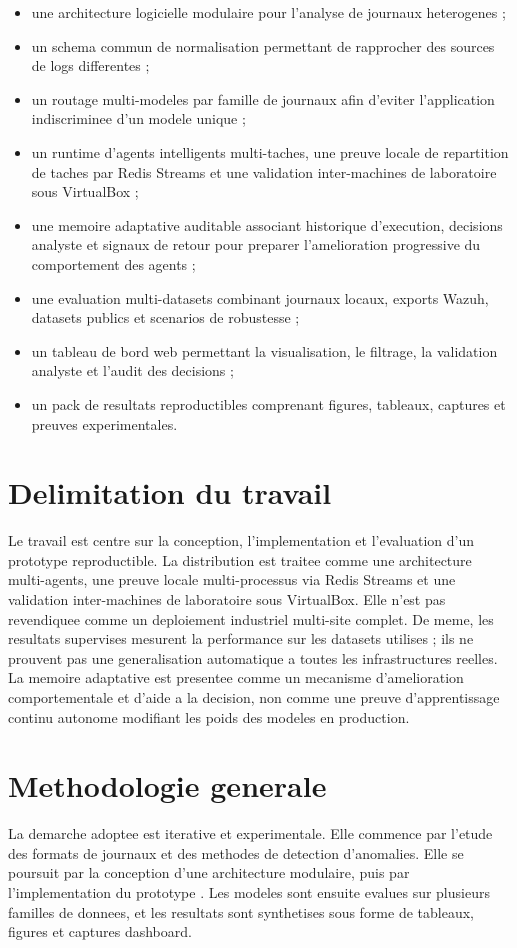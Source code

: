 \begin{itemize}
  \item une architecture logicielle modulaire pour l'analyse de journaux heterogenes ;
  \item un schema commun de normalisation permettant de rapprocher des sources de logs differentes ;
  \item un routage multi-modeles par famille de journaux afin d'eviter l'application indiscriminee d'un modele unique ;
  \item un runtime d'agents intelligents multi-taches, une preuve locale de repartition de taches par Redis Streams et une validation inter-machines de laboratoire sous VirtualBox ;
  \item une memoire adaptative auditable associant historique d'execution, decisions analyste et signaux de retour pour preparer l'amelioration progressive du comportement des agents ;
  \item une evaluation multi-datasets combinant journaux locaux, exports Wazuh, datasets publics et scenarios de robustesse ;
  \item un tableau de bord web permettant la visualisation, le filtrage, la validation analyste et l'audit des decisions ;
  \item un pack de resultats reproductibles comprenant figures, tableaux, captures et preuves experimentales.
\end{itemize}

\section{Delimitation du travail}
Le travail est centre sur la conception, l'implementation et l'evaluation d'un prototype reproductible. La distribution est traitee comme une architecture multi-agents, une preuve locale multi-processus via Redis Streams et une validation inter-machines de laboratoire sous VirtualBox. Elle n'est pas revendiquee comme un deploiement industriel multi-site complet. De meme, les resultats supervises mesurent la performance sur les datasets utilises ; ils ne prouvent pas une generalisation automatique a toutes les infrastructures reelles. La memoire adaptative est presentee comme un mecanisme d'amelioration comportementale et d'aide a la decision, non comme une preuve d'apprentissage continu autonome modifiant les poids des modeles en production.

\section{Methodologie generale}
La demarche adoptee est iterative et experimentale. Elle commence par l'etude des formats de journaux et des methodes de detection d'anomalies. Elle se poursuit par la conception d'une architecture modulaire, puis par l'implementation du prototype \logminer. Les modeles sont ensuite evalues sur plusieurs familles de donnees, et les resultats sont synthetises sous forme de tableaux, figures et captures dashboard.

